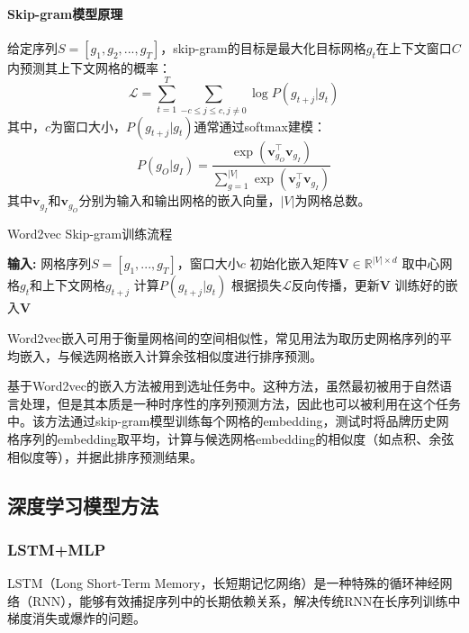 \documentclass{article}
\begin{document}
\paragraph{Skip-gram模型原理}
给定序列$S = [g_1, g_2, ..., g_T]$，skip-gram的目标是最大化目标网格$g_t$在上下文窗口$C$内预测其上下文网格的概率：
\begin{equation}
\mathcal{L} = \sum_{t=1}^{T} \sum_{-c \leq j \leq c, j \neq 0} \log P(g_{t+j} | g_t)
\end{equation}
其中，$c$为窗口大小，$P(g_{t+j} | g_t)$通常通过softmax建模：
\begin{equation}
P(g_O | g_I) = \frac{\exp(\mathbf{v}_{g_O}^\top \mathbf{v}_{g_I})}{\sum_{g=1}^{|V|} \exp(\mathbf{v}_g^\top \mathbf{v}_{g_I})}
\end{equation}
其中$\mathbf{v}_{g_I}$和$\mathbf{v}_{g_O}$分别为输入和输出网格的嵌入向量，$|V|$为网格总数。

\begin{algorithm}[H]
\caption{Word2vec Skip-gram训练流程}
\begin{algorithmic}[1]
\State \textbf{输入:} 网格序列$S = [g_1, ..., g_T]$，窗口大小$c$
\State 初始化嵌入矩阵$\mathbf{V} \in \mathbb{R}^{|V| \times d}$
        \State 取中心网格$g_t$和上下文网格$g_{t+j}$
        \State 计算$P(g_{t+j} | g_t)$
        \State 根据损失$\mathcal{L}$反向传播，更新$\mathbf{V}$
    \EndFor
\EndFor
\State \Return 训练好的嵌入$\mathbf{V}$
\end{algorithmic}
\end{algorithm}

Word2vec嵌入可用于衡量网格间的空间相似性，常见用法为取历史网格序列的平均嵌入，与候选网格嵌入计算余弦相似度进行排序预测。

基于Word2vec的嵌入方法被用到选址任务中。这种方法，虽然最初被用于自然语言处理，但是其本质是一种时序性的序列预测方法\cite{mohan_link_2021}，因此也可以被利用在这个任务中。该方法通过skip-gram模型训练每个网格的embedding，测试时将品牌历史网格序列的embedding取平均，计算与候选网格embedding的相似度（如点积、余弦相似度等），并据此排序预测结果。
\subsection{深度学习模型方法}
\subsubsection{LSTM+MLP}

LSTM（Long Short-Term Memory，长短期记忆网络）是一种特殊的循环神经网络（RNN），能够有效捕捉序列中的长期依赖关系，解决传统RNN在长序列训练中梯度消失或爆炸的问题\cite{hochreiter_long_1997}。
\end{document}

